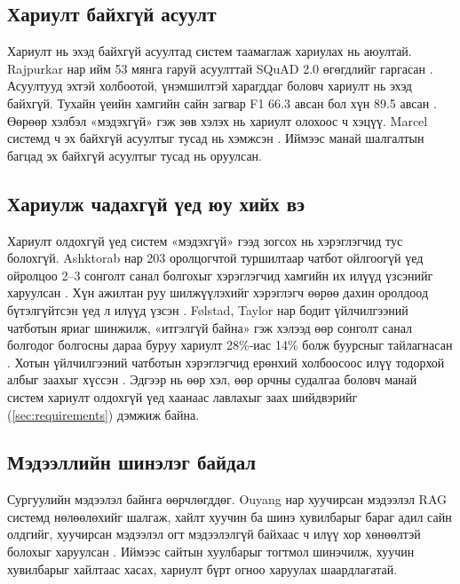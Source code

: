 \subsection{Хариулт байхгүй асуулт}

Хариулт нь эхэд байхгүй асуултад систем таамаглаж хариулах нь аюултай. Rajpurkar нар ийм 53 мянга гаруй асуулттай SQuAD 2.0 өгөгдлийг гаргасан \cite{rajpurkar2018squad2}. Асуултууд эхтэй холбоотой, үнэмшилтэй харагддаг боловч хариулт нь эхэд байхгүй. Тухайн үеийн хамгийн сайн загвар F1 66.3 авсан бол хүн 89.5 авсан \cite{rajpurkar2018squad2}. Өөрөөр хэлбэл «мэдэхгүй» гэж зөв хэлэх нь хариулт олохоос ч хэцүү. Marcel системд ч эх байхгүй асуултыг тусад нь хэмжсэн \cite{trienes2025marcel}. Иймээс манай шалгалтын багцад эх байхгүй асуултыг тусад нь оруулсан.

\subsection{Хариулж чадахгүй үед юу хийх вэ}
\label{sec:lit-referral}

Хариулт олдохгүй үед систем «мэдэхгүй» гээд зогсох нь хэрэглэгчид тус болохгүй. Ashktorab нар 203 оролцогчтой туршилтаар чатбот ойлгоогүй үед ойролцоо 2--3 сонголт санал болгохыг хэрэглэгчид хамгийн их илүүд үзсэнийг харуулсан \cite{ashktorab2019resilient}. Хүн ажилтан руу шилжүүлэхийг хэрэглэгч өөрөө дахин оролдоод бүтэлгүйтсэн үед л илүүд үзсэн \cite{ashktorab2019resilient}. Følstad, Taylor нар бодит үйлчилгээний чатботын яриаг шинжилж, «итгэлгүй байна» гэж хэлээд өөр сонголт санал болгодог болгосны дараа буруу хариулт 28\%-иас 14\% болж буурсныг тайлагнасан \cite{folstad2021investigating}. Хотын үйлчилгээний чатботын хэрэглэгчид ерөнхий холбоосоос илүү тодорхой албыг заахыг хүссэн \cite{zhou2025publicservice}. Эдгээр нь өөр хэл, өөр орчны судалгаа боловч манай систем хариулт олдохгүй үед хаанаас лавлахыг заах шийдвэрийг (\ref{sec:requirements}) дэмжиж байна.

\subsection{Мэдээллийн шинэлэг байдал}

Сургуулийн мэдээлэл байнга өөрчлөгддөг. Ouyang нар хуучирсан мэдээлэл RAG системд нөлөөлөхийг шалгаж, хайлт хуучин ба шинэ хувилбарыг бараг адил сайн олдгийг, хуучирсан мэдээлэл огт мэдээлэлгүй байхаас ч илүү хор хөнөөлтэй болохыг харуулсан \cite{ouyang2025hoh}. Иймээс сайтын хуулбарыг тогтмол шинэчилж, хуучин хувилбарыг хайлтаас хасах, хариулт бүрт огноо харуулах шаардлагатай.

